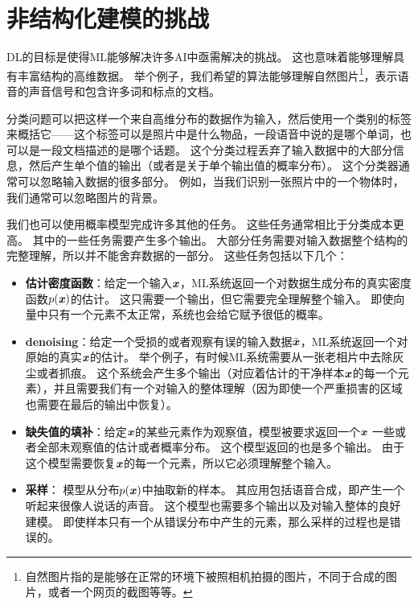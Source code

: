 \section{非结构化建模的挑战}
\label{sec:the_challenge_of_unstructured_modelling}


\gls{DL}的目标是使得\gls{ML}能够解决许多\gls{AI}中亟需解决的挑战。
这也意味着能够理解具有丰富结构的高维数据。%
举个例子，我们希望的算法能够理解自然图片\footnote{自然图片指的是能够在正常的环境下被照相机拍摄的图片，不同于合成的图片，或者一个网页的截图等等。}，表示语音的声音信号和包含许多词和标点的文档。


分类问题可以把这样一个来自高维分布的数据作为输入，然后使用一个类别的标签来概括它——这个标签可以是照片中是什么物品，一段语音中说的是哪个单词，也可以是一段文档描述的是哪个话题。
这个分类过程丢弃了输入数据中的大部分信息，然后产生单个值的输出（或者是关于单个输出值的概率分布）。
这个分类器通常可以忽略输入数据的很多部分。
例如，当我们识别一张照片中的一个物体时，我们通常可以忽略图片的背景。


我们也可以使用概率模型完成许多其他的任务。
这些任务通常相比于分类成本更高。
其中的一些任务需要产生多个输出。
大部分任务需要对输入数据整个结构的完整理解，所以并不能舍弃数据的一部分。
这些任务包括以下几个：
\begin{itemize}
\item \textbf{估计密度函数}：给定一个输入$\boldsymbol{\mathit{x}}$，\gls{ML}系统返回一个对数据生成分布的真实密度函数$p(\boldsymbol{\mathit{x}})$的估计。
这只需要一个输出，但它需要完全理解整个输入。
即使向量中只有一个元素不太正常，系统也会给它赋予很低的概率。
	
	
\item
\textbf{\gls{denoising}}：给定一个受损的或者观察有误的输入数据$\tilde{\boldsymbol{\mathit{x}}}$，\gls{ML}系统返回一个对原始的真实$\boldsymbol{\mathit{x}}$的估计。
举个例子，有时候\gls{ML}系统需要从一张老相片中去除灰尘或者抓痕。
这个系统会产生多个输出（对应着估计的干净样本$\boldsymbol{\mathit{x}}$的每一个元素），并且需要我们有一个对输入的整体理解（因为即使一个严重损害的区域也需要在最后的输出中恢复）。%
	
\item
\textbf{缺失值的填补}：给定$\boldsymbol{\mathit{x}}$的某些元素作为观察值，模型被要求返回一个$\boldsymbol{\mathit{x}}$
一些或者全部未观察值的估计或者概率分布。
这个模型返回的也是多个输出。
由于这个模型需要恢复$\boldsymbol{\mathit{x}}$的每一个元素，所以它必须理解整个输入。
	
	
\item \textbf{采样}： 模型从分布$p(\boldsymbol{\mathit{x}})$中抽取新的样本。
其应用包括语音合成，即产生一个听起来很像人说话的声音。
这个模型也需要多个输出以及对输入整体的良好建模。
即使样本只有一个从错误分布中产生的元素，那么采样的过程也是错误的。 
\end{itemize}

